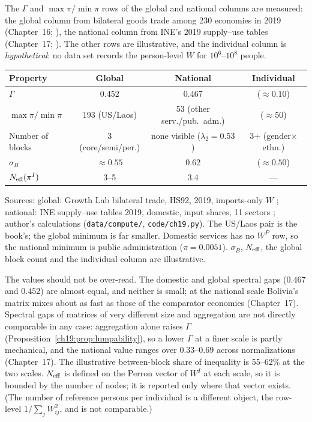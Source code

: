 \documentclass[../structural_economics_book.tex]{subfiles}
\begin{document}
\begin{example}\label{ch19:ex:bolivia_three}
The $\Gamma$ and $\max\pi/\min\pi$ rows of the global and national columns are measured: the global column from bilateral goods trade among 230 economies in 2019 (Chapter~16; \citealp{growthlab2026atlas}), the national column from INE's 2019 supply--use tables (Chapter~17; \citealp{ine2026sut}). The other rows are illustrative, and the individual column is \emph{hypothetical}: no data set records the person-level $W$ for $10^6$--$10^8$ people.
\begin{center}
\small
\begin{tabularx}{\textwidth}{Lccc}
\toprule
Property & Global & National & Individual \\
\midrule
$\Gamma$ & 0.452 & 0.467 & ($\approx 0.10$) \\
$\max\pi / \min\pi$ & 193 (US/Laos) & 53 (other serv./pub.\ adm.) & ($\approx 50$) \\
Number of blocks & 3 (core/semi/per.) & none visible ($\lambda_2 = 0.53$) & 3+ (gender$\times$ethn.) \\
$\sigma_B$ & $\approx 0.55$ & 0.62 & ($\approx 0.50$) \\
$N_{\text{eff}}(\pi^I)$ & 3--5 & 3.4 & --- \\
\bottomrule
\end{tabularx}
\par\footnotesize Sources: global: Growth Lab bilateral trade, HS92, 2019, imports-only $W$ \citep{growthlab2026atlas}; national: INE supply--use tables 2019, domestic, input shares, 11 sectors \citep{ine2026sut}; author's calculations (\texttt{data/compute/}, \texttt{code/ch19.py}). The US/Laos pair is the book's; the global minimum is far smaller. Domestic services has no $W^P$ row, so the national minimum is public administration ($\pi = 0.0051$). $\sigma_B$, $N_{\text{eff}}$, the global block count and the individual column are illustrative.
\end{center}

The values should not be over-read. The domestic and global spectral gaps ($0.467$ and $0.452$) are almost equal, and neither is small; at the national scale Bolivia's matrix mixes about as fast as those of the comparator economies (Chapter~17). Spectral gaps of matrices of very different size and aggregation are not directly comparable in any case: aggregation alone raises $\Gamma$ (Proposition~\ref{ch19:prop:lumpability}), so a lower $\Gamma$ at a finer scale is partly mechanical, and the national value ranges over $0.33$--$0.69$ across normalizations (Chapter~17). The illustrative between-block share of inequality is 55--62\% at the two scales. $N_{\text{eff}}$ is defined on the Perron vector of $W^I$ at each scale, so it is bounded by the number of nodes; it is reported only where that vector exists. (The number of reference persons per individual is a different object, the row-level $1/\sum_j W_{ij}^2$, and is not comparable.)
\end{example}
\end{document}
